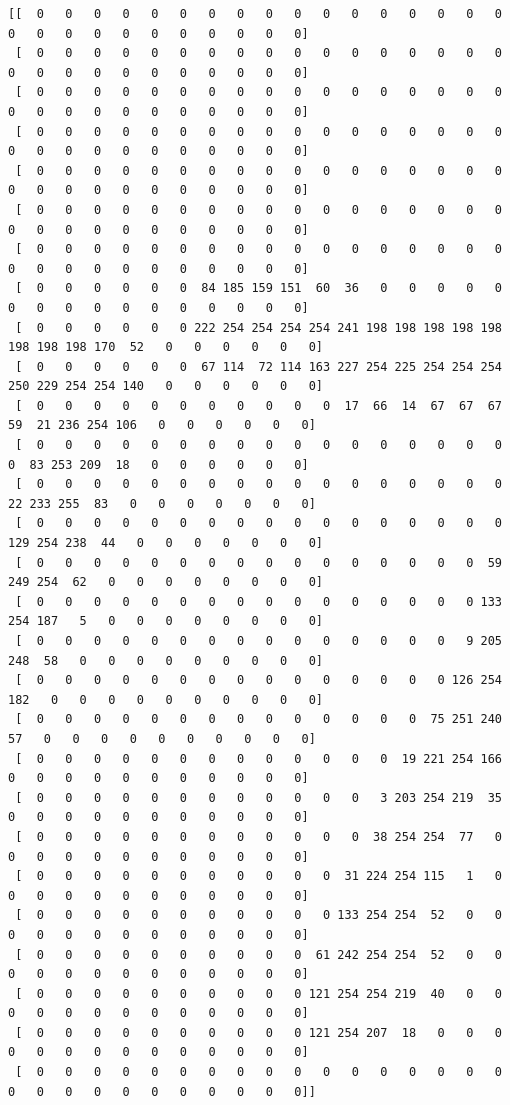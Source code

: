 \documentclass[12pt]{article}
\begin{document}
{\tiny
\begin{verbatim}
[[  0   0   0   0   0   0   0   0   0   0   0   0   0   0   0   0   0   0   0   0   0   0   0   0   0   0   0   0]
 [  0   0   0   0   0   0   0   0   0   0   0   0   0   0   0   0   0   0   0   0   0   0   0   0   0   0   0   0]
 [  0   0   0   0   0   0   0   0   0   0   0   0   0   0   0   0   0   0   0   0   0   0   0   0   0   0   0   0]
 [  0   0   0   0   0   0   0   0   0   0   0   0   0   0   0   0   0   0   0   0   0   0   0   0   0   0   0   0]
 [  0   0   0   0   0   0   0   0   0   0   0   0   0   0   0   0   0   0   0   0   0   0   0   0   0   0   0   0]
 [  0   0   0   0   0   0   0   0   0   0   0   0   0   0   0   0   0   0   0   0   0   0   0   0   0   0   0   0]
 [  0   0   0   0   0   0   0   0   0   0   0   0   0   0   0   0   0   0   0   0   0   0   0   0   0   0   0   0]
 [  0   0   0   0   0   0  84 185 159 151  60  36   0   0   0   0   0   0   0   0   0   0   0   0   0   0   0   0]
 [  0   0   0   0   0   0 222 254 254 254 254 241 198 198 198 198 198 198 198 198 170  52   0   0   0   0   0   0]
 [  0   0   0   0   0   0  67 114  72 114 163 227 254 225 254 254 254 250 229 254 254 140   0   0   0   0   0   0]
 [  0   0   0   0   0   0   0   0   0   0   0  17  66  14  67  67  67  59  21 236 254 106   0   0   0   0   0   0]
 [  0   0   0   0   0   0   0   0   0   0   0   0   0   0   0   0   0   0  83 253 209  18   0   0   0   0   0   0]
 [  0   0   0   0   0   0   0   0   0   0   0   0   0   0   0   0   0  22 233 255  83   0   0   0   0   0   0   0]
 [  0   0   0   0   0   0   0   0   0   0   0   0   0   0   0   0   0 129 254 238  44   0   0   0   0   0   0   0]
 [  0   0   0   0   0   0   0   0   0   0   0   0   0   0   0   0  59 249 254  62   0   0   0   0   0   0   0   0]
 [  0   0   0   0   0   0   0   0   0   0   0   0   0   0   0   0 133 254 187   5   0   0   0   0   0   0   0   0]
 [  0   0   0   0   0   0   0   0   0   0   0   0   0   0   0   9 205 248  58   0   0   0   0   0   0   0   0   0]
 [  0   0   0   0   0   0   0   0   0   0   0   0   0   0   0 126 254 182   0   0   0   0   0   0   0   0   0   0]
 [  0   0   0   0   0   0   0   0   0   0   0   0   0   0  75 251 240  57   0   0   0   0   0   0   0   0   0   0]
 [  0   0   0   0   0   0   0   0   0   0   0   0   0  19 221 254 166   0   0   0   0   0   0   0   0   0   0   0]
 [  0   0   0   0   0   0   0   0   0   0   0   0   3 203 254 219  35   0   0   0   0   0   0   0   0   0   0   0]
 [  0   0   0   0   0   0   0   0   0   0   0   0  38 254 254  77   0   0   0   0   0   0   0   0   0   0   0   0]
 [  0   0   0   0   0   0   0   0   0   0   0  31 224 254 115   1   0   0   0   0   0   0   0   0   0   0   0   0]
 [  0   0   0   0   0   0   0   0   0   0   0 133 254 254  52   0   0   0   0   0   0   0   0   0   0   0   0   0]
 [  0   0   0   0   0   0   0   0   0   0  61 242 254 254  52   0   0   0   0   0   0   0   0   0   0   0   0   0]
 [  0   0   0   0   0   0   0   0   0   0 121 254 254 219  40   0   0   0   0   0   0   0   0   0   0   0   0   0]
 [  0   0   0   0   0   0   0   0   0   0 121 254 207  18   0   0   0   0   0   0   0   0   0   0   0   0   0   0]
 [  0   0   0   0   0   0   0   0   0   0   0   0   0   0   0   0   0   0   0   0   0   0   0   0   0   0   0   0]]
\end{verbatim}
}
\end{document}
